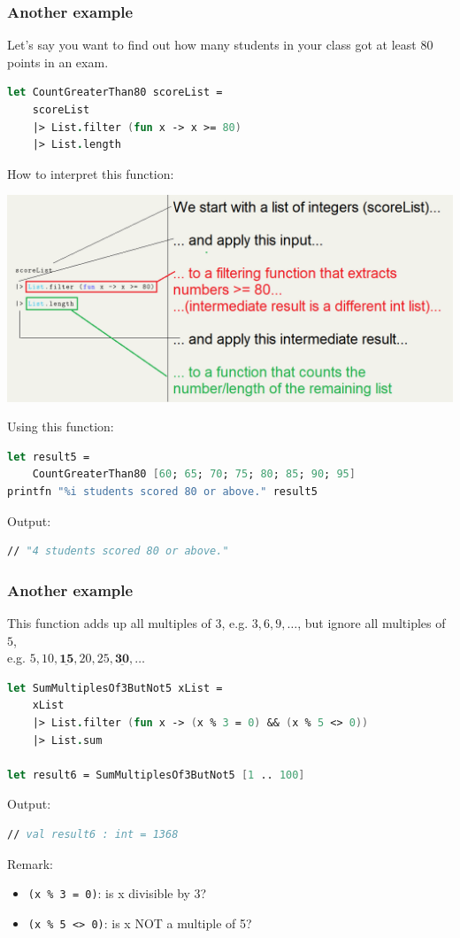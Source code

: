 \documentclass[12pt]{article}
\begin{document}
\subsubsection*{Another example}
Let's say you want to find out how many students in your class got at least $80$ points in an exam.
\begin{lstlisting}[language=FSharp]
let CountGreaterThan80 scoreList =
    scoreList
    |> List.filter (fun x -> x >= 80)
    |> List.length
\end{lstlisting}
How to interpret this function:
\begin{center}
\includegraphics[width=16cm]{pictures/picture27.png}
\end{center}
Using this function:
\begin{lstlisting}[language=FSharp]
let result5 = 
    CountGreaterThan80 [60; 65; 70; 75; 80; 85; 90; 95]
printfn "%i students scored 80 or above." result5
\end{lstlisting}
Output:
\begin{lstlisting}[language=FSharp]
// "4 students scored 80 or above."
\end{lstlisting}

\pagebreak
\subsubsection*{Another example}
This function adds up all multiples of $3$, e.g. $3, 6, 9, \ldots$, but ignore all multiples of $5$,
\\ e.g. $5, 10, \underline{\mathbf{15}}, 20, 25, \underline{\mathbf{30}}, \ldots$
\begin{lstlisting}[language=FSharp]
let SumMultiplesOf3ButNot5 xList =
    xList
    |> List.filter (fun x -> (x % 3 = 0) && (x % 5 <> 0))
    |> List.sum

let result6 = SumMultiplesOf3ButNot5 [1 .. 100]
\end{lstlisting}
Output: 
\begin{lstlisting}[language=FSharp]
// val result6 : int = 1368
\end{lstlisting}
Remark:
\begin{itemize}
\item \texttt{(x \% 3 = 0)}: is x divisible by 3?
\item \texttt{(x \% 5 <> 0)}: is x NOT a multiple of 5?
\end{itemize}
\end{document}
